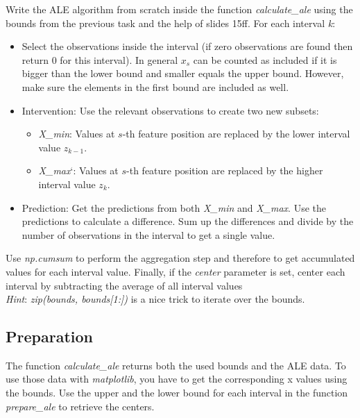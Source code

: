 \documentclass[a4paper]{article}
\begin{document}
Write the ALE algorithm from scratch inside the function \textit{calculate\_ale} using the bounds from the previous task and the help of slides 15ff. For each interval \textit{k}:
\begin{itemize}
    \item Select the observations inside the interval (if zero observations are found then return 0 for this interval). In general $x_s$ can be counted as included if it is bigger than the lower bound and smaller equals the upper bound. However, make sure the elements in the first bound are included as well.
    \item Intervention: Use the relevant observations to create two new subsets:
    
    \begin{itemize}
        \item \textit{X\_min}: Values at $s$-th feature position are replaced by the lower interval value $z_{k-1}$.
        \item \textit{X\_max}`: Values at $s$-th feature position are replaced by the higher interval value $z_k$.
    \end{itemize}

    \item Prediction: Get the predictions from both \textit{X\_min} and \textit{X\_max}. Use the predictions to calculate a
      difference. Sum up the differences and divide by the number of observations in the interval to get a single value.
    
\end{itemize}

\noindent Use \textit{np.cumsum} to perform the aggregation step and therefore to get accumulated values for each interval value. Finally, if the \textit{center} parameter is set, center each interval by subtracting the average of all interval values\\

\noindent \textit{Hint}: \textit{zip(bounds, bounds[1:])} is a nice trick to iterate over the bounds.


\subsection{Preparation}

The function \textit{calculate\_ale} returns both the used bounds and the ALE data. To use those data with \textit{matplotlib}, you have to get the corresponding x values using the bounds. Use the upper and the lower bound for each interval in the function \textit{prepare\_ale} to retrieve the centers.
\end{document}
